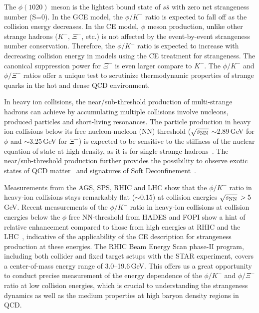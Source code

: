 \documentclass[%
 reprint,	
showpacs,
 amsmath,amssymb,
 aps,
 prc,
]{revtex4-1}
\begin{document}
The $\phi(1020)$ meson is the lightest bound state of $s\bar{s}$ with zero net strangeness number (S=0). %
In the GCE model, the $\phi/K^-$ ratio is expected to fall off as the collision energy decreases. In the CE model, $\phi$ meson production, unlike other strange hadrons ($K^-$, $\Xi^-$, etc.) is not affected by the event-by-event strangeness number conservation.
Therefore, the $\phi/K^-$ ratio is expected to increase with decreasing collision energy in models using the CE treatment for strangeness. The canonical suppression power for $\Xi^-$ is even larger compare to $K^-$. The $\phi/K^-$ and $\phi/\Xi^-$ ratios offer a unique test to scrutinize thermodynamic properties of strange quarks in the hot and dense QCD environment.

In heavy ion collisions, the near/sub-threshold production of multi-strange hadrons can achieve by accumulating multiple collisions involve nucleons, produced particles and short-living resonances. The particle production in heavy ion collisions below its free nucleon-nucleon (NN) threshold ($\sqrt{s_{\rm NN}}$ $\sim$2.89\,GeV for $\phi$ and $\sim$3.25\,GeV for $\Xi^-$) is expected to be sensitive to the stiffness of the nuclear equation of state at high density, as it is for single-strange hadrons~\cite{KO.PhysRevLett.55.2661,FUCHS20061_kaons}. The near/sub-threshold production further provides the possibility
to observe exotic states of QCD matter~\cite{McLerran:2007qj} and signatures of Soft Deconfinement~\cite{Fukushima:2020cmk}.
 
Measurements from the AGS, SPS, RHIC and LHC show that the $\phi/K^-$ ratio in heavy-ion collisions stays remarkably flat ($\sim$0.15) at collision energies $\sqrt{s_{\rm NN}}\,>\,$5\,GeV. Recent measurements of the $\phi/K^-$ ratio in heavy-ion collisions at collision energies below the $\phi$ free NN-threshold from HADES and FOPI show a hint of relative enhancement compared to those from high energies at RHIC and the LHC~\cite{E917_phi,NA49_phi,FOPI_phi_AlAl,FOPI_phi_NiNi,HADES_phi_ArKCl,HADES_phi_AuAu}, indicative of the applicability of the CE description for strangeness production at these energies. %
The RHIC Beam Energy Scan phase-II program, including both collider and fixed target setups with the STAR experiment, covers a center-of-mass energy range of 3.0--19.6\,GeV. This offers us a great opportunity to conduct precise measurement of the energy dependence of the $\phi/K^-$ and $\phi/\Xi^-$ ratio at low collision energies, which is crucial to understanding the strangeness dynamics as well as the medium properties at high baryon density regions in QCD.
\end{document}
